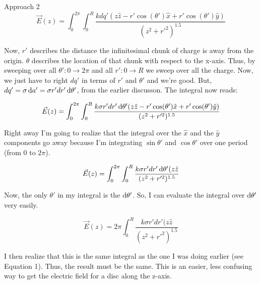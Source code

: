 \begin{homeworkProblem}
\begin{homeworkSection}{Approach 2}
        \[ \vec{E}(z) = \int_0^{2\pi} \int_0^R \frac{k dq' (z \hat{z}-
        r'\cos(\theta')\hat{x}+r'\cos(\theta')\hat{y})}{(z^2+r'^2)^{1.5}}
        \]

        Now, $r'$ describes the distance the infinitesimal chunk of
        charge is away from the origin. $\theta$ describes the location
        of that chunk with respect to the x-axis. Thus, by sweeping over
        all $\theta': 0 \rightarrow 2\pi$ and all $r': 0 \rightarrow R$ we
        sweep over all the charge. Now, we just have to right $dq'$ in
        terms of $r'$ and $\theta'$ and we're good. But, $dq' = \sigma
        \mathop{}\!\mathrm{d} a' = \sigma r' dr' \mathop{}\!\mathrm{d} \theta'$, from the earlier
        discusson. The integral now reads:

        \[ \vec{E}(z) = \int_0^{2\pi} \int_0^R \frac{k \sigma r' dr'
        \mathop{}\!\mathrm{d} \theta' (z \hat{z}-
        r'\cos(\theta')\hat{x}+r'\cos(\theta')\hat{y})}{(z^2+r'^2)^{1.5}}
        \]

       Right away I'm going to realize that the integral over the
       $\hat{x}$ and the $\hat{y}$ components go away because I'm
       integrating $\sin\theta'$ and $\cos\theta'$ over one period (from
       0 to $2\pi$).

        \[ \vec{E}(z) = \int_0^{2\pi} \int_0^R \frac{k \sigma r' dr'
        \mathop{}\!\mathrm{d} \theta' (z \hat{z} }{(z^2+r'^2)^{1.5}}
        \]

        Now, the only $\theta'$ in my integral is the $\mathop{}\!\mathrm{d} \theta'$.
        So, I can evaluate the integral over $\mathop{}\!\mathrm{d} \theta'$ very
        easily. 

        \[ \vec{E}(z) = 2\pi \int_0^R \frac{k \sigma r' dr'
        (z \hat{z} }{(z^2+r'^2)^{1.5}}
        \]

        I then realize that this is the same integral as the one I was
        doing earlier (see Equation 1). Thus, the result must be the
        same. This is an easier, less confusing way to get the electric
        field for a disc along the z-axis.

    \end{homeworkSection}    
\end{homeworkProblem}

